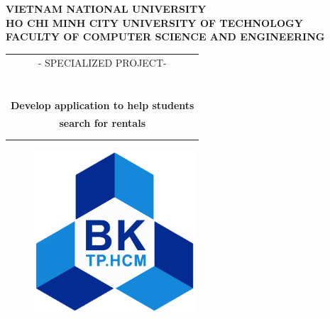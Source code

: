 \documentclass[16pt]{report}
\begin{document}
\setlength{\parindent}{0pt}




\begin{titlepage}
\begin{center}
\textbf{\fontsize{13pt}{18pt}\selectfont VIETNAM NATIONAL UNIVERSITY}\\
\textbf{\fontsize{13pt}{18pt}\selectfont HO CHI MINH CITY UNIVERSITY OF TECHNOLOGY}\\
\textbf{\fontsize{13pt}{18pt}\selectfont FACULTY OF COMPUTER SCIENCE AND ENGINEERING}
\end{center}

\vspace{1cm}

\begin{center}
\begin{tabular}{c}
{\fontsize{13pt}{18pt}\selectfont - SPECIALIZED PROJECT- }\\
~~\\
\hline
\\
\\
\textbf{{\huge Develop application to help students}}\\
\textbf{{\huge search for rentals }}\\
\\
\\
\hline
\end{tabular}
\end{center}

\vspace{1cm}

\begin{figure}[h!]
\begin{center}
\includegraphics[width=6cm]{Images/BK.png}
\end{center}
\end{figure}




\end{titlepage}
\end{document}
